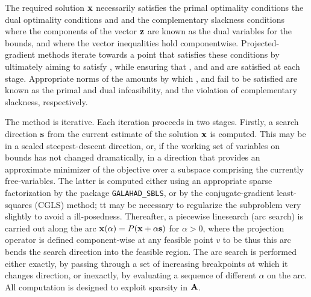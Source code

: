 \documentclass{galahad}
\begin{document}

\galmethod
The required solution ${\mathbf{x}}$ necessarily satisfies
the primal optimality conditions
the dual optimality conditions
and
and the complementary slackness conditions
where the components of the vector ${\mathbf{z}}$ are known as
the dual variables for the bounds,
and where the vector inequalities hold componentwise.
Projected-gradient methods iterate towards a point
that satisfies these conditions by ultimately aiming to satisfy
, while ensuring that
, and  and  are satisfied at each stage.
Appropriate norms of the amounts by
which ,  and  fail to be satisfied are known as the
primal and dual infeasibility, and the violation of complementary slackness,
respectively.

The method is iterative. Each iteration proceeds in two stages.
Firstly, a search direction ${\mathbf{s}}$ from the current estimate of the solution
${\mathbf{x}}$ is computed. This may be in a scaled steepest-descent direction, or,
if the working set of variables on bounds has not changed dramatically,
in a direction that provides an approximate minimizer of the objective
over a subspace comprising the currently free-variables. The latter is
computed either using an appropriate sparse factorization by the
package {\tt GALAHAD\_SBLS}, or by the
conjugate-gradient least-squares (CGLS) method; tt may be necessary to
regularize the subproblem very slightly to avoid a ill-posedness.
Thereafter, a piecewise linesearch (arc search) is carried out along
the arc ${\mathbf{x}}(\alpha) = P( {\mathbf{x}} + \alpha {\mathbf{s}})$ for $\alpha > 0$,
where the projection operator
is defined component-wise at any feasible point $v$ to be
thus this arc bends the search direction into the feasible region.
The arc search is performed either exactly, by passing through a set
of increasing breakpoints at which it changes direction, or inexactly,
by evaluating a sequence of different $\alpha$  on the arc.
All computation is designed to exploit sparsity in ${\mathbf{A}}$.

\vspace*{1mm}

\galreferences
\vspace*{1mm}
\end{document}

